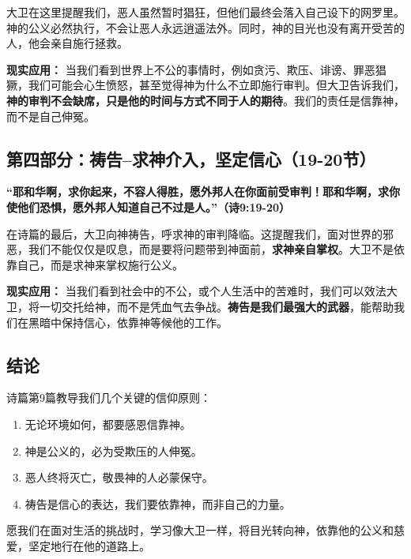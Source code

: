\documentclass[a4paper, 12pt]{article}
\begin{document}
大卫在这里提醒我们，恶人虽然暂时猖狂，但他们最终会落入自己设下的网罗里。神的公义必然执行，不会让恶人永远逍遥法外。同时，神的目光也没有离开受苦的人，他会亲自施行拯救。

\vspace{0.2cm}

\textbf{现实应用：}
当我们看到世界上不公的事情时，例如贪污、欺压、诽谤、罪恶猖獗，我们可能会心生愤怒，甚至觉得神为什么不立即施行审判。但大卫告诉我们，\textbf{神的审判不会缺席，只是他的时间与方式不同于人的期待}。我们的责任是信靠神，而不是自己伸冤。

\subsection*{第四部分：祷告--求神介入，坚定信心（19-20节）}

\textbf{“耶和华啊，求你起来，不容人得胜，愿外邦人在你面前受审判！耶和华啊，求你使他们恐惧，愿外邦人知道自己不过是人。”（诗9:19-20）}

\vspace{0.2cm}

在诗篇的最后，大卫向神祷告，呼求神的审判降临。这提醒我们，面对世界的邪恶，我们不能仅仅是叹息，而是要将问题带到神面前，\textbf{求神亲自掌权}。大卫不是依靠自己，而是求神来掌权施行公义。

\vspace{0.2cm}

\textbf{现实应用：}  
当我们看到社会中的不公，或个人生活中的苦难时，我们可以效法大卫，将一切交托给神，而不是凭血气去争战。\textbf{祷告是我们最强大的武器}，能帮助我们在黑暗中保持信心，依靠神等候他的工作。

\subsection*{结论}

诗篇第9篇教导我们几个关键的信仰原则：  

\begin{enumerate}
    \item 无论环境如何，都要感恩信靠神。
    \item 神是公义的，必为受欺压的人伸冤。
    \item 恶人终将灭亡，敬畏神的人必蒙保守。
    \item 祷告是信心的表达，我们要依靠神，而非自己的力量。
\end{enumerate}


愿我们在面对生活的挑战时，学习像大卫一样，将目光转向神，依靠他的公义和慈爱，坚定地行在他的道路上。
\end{document}
